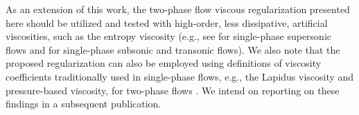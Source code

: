 As an extension of this work, the two-phase flow viscous regularization presented here should be utilized and tested with high-order, less dissipative, artificial viscosities, 
such as the entropy viscosity (e.g., see \cite{jlg1} for single-phase supersonic flows and \cite{Marco_paper_low_mach} for single-phase subsonic and transonic flows). 
We also note that the proposed regularization can also be employed using definitions of viscosity coefficients traditionally used in single-phase flows, e.g., 
the Lapidus viscosity \cite{Lapidus_paper,Lapidus_book} and pressure-based viscosity, for two-phase flows \cite{PBV_book}. We intend on reporting on these findings in 
a subsequent publication. 
%
